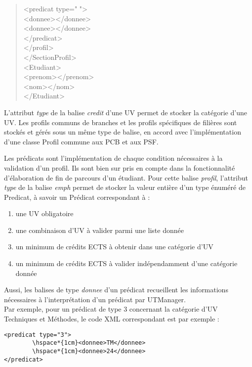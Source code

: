 \documentclass[a4paper,10pt,french]{report}
\begin{document}
\begin{quote}
	\hspace*{1cm}\hspace*{1cm}	<predicat type=" "> \\
		\hspace*{1cm}\hspace*{1cm}\hspace*{1cm}	<donnee></donnee>\\
		\hspace*{1cm}\hspace*{1cm}\hspace*{1cm}	<donnee></donnee>\\
		\hspace*{1cm}\hspace*{1cm}</predicat>\\
	\hspace*{1cm}</profil>\\
</SectionProfil>\\
<Etudiant>\\
	\hspace*{1cm}<prenom></prenom>\\
	\hspace*{1cm}<nom></nom>\\
</Etudiant>\\
		\end{quote}
		
	L'attribut \emph{type} de la balise \emph{credit} d'une UV permet de stocker la catégorie d'une UV.
	Les profils communs de branches et les profils spécifiques de filières sont stockés et gérés sous un même type de balise, en accord avec l'implémentation d'une classe Profil commune aux PCB et aux PSF.
	
	Les prédicats sont l'implémentation de chaque condition nécessaires à la validation d'un profil.
	Ils sont bien sur pris en compte dans la fonctionnalité d'élaboration de fin de parcours d'un étudiant.	
	Pour cette balise \emph{profil}, l'attribut \emph{type} de la balise \emph{emph} permet de stocker la valeur entière d'un type énuméré de Predicat, à savoir un Prédicat correspondant à :
	\begin{enumerate}
	\item une UV obligatoire
	\item une combinaison d'UV à valider parmi une liste donnée
	\item un minimum de crédits ECTS à obtenir dans une catégorie d'UV
	\item un minimum de crédits ECTS à valider indépendamment d'une catégorie donnée
	\end{enumerate}
	Aussi, les balises de type \emph{donnee} d'un prédicat recueillent les informations nécessaires à l'interprétation d'un prédicat par UTManager.\\
	Par exemple, pour un prédicat de type 3 concernant la catégorie d'UV Techniques et Méthodes, le code XML correspondant est par exemple :
	\begin{verbatim}
<predicat type="3">
		\hspace*{1cm}<donnee>TM</donnee>
		\hspace*{1cm}<donnee>24</donnee>
</predicat>
	\end{verbatim}
	
\end{document}
